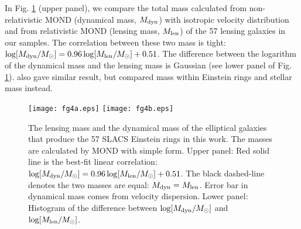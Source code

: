 \documentclass[fleqn,usenatbib,useAMS]{mnras}
\begin{document}
    In Fig. \ref{fig:Mass} (upper panel), we compare the total mass calculated from non-relativistic MOND (dynamical mass, $M_{\rm dyn}$) with isotropic velocity distribution and from relativistic MOND (lensing mass, $M_{\rm len}$) of the 57 lensing galaxies in our samples.
    The correlation between these two mass is tight: $\log[M_{\rm dyn}/M_{\odot}]=0.96\log[M_{\rm len}/M_{\odot}]+0.51$.
    The difference between the logarithm of the dynamical mass and the lensing mass is Gaussian (see lower panel of Fig. \ref{fig:Mass}).
    \cite{Sanders14} also gave similar result, but compared mass within Einstein rings and stellar mass instead.

    \begin{figure}
        \centering
        \texttt{[image: fg4a.eps]}
        \texttt{[image: fg4b.eps]}
        \caption{The lensing mass and the dynamical mass of the elliptical galaxies that produce the 57 SLACS Einstein rings in this work.
        The masses are calculated by MOND with simple form.
        Upper panel:
        Red solid line is the best-fit linear correlation: $\log[M_{\rm dyn}/M_{\odot}]=0.96\log[M_{\rm len}/M_{\odot}]+0.51$.
        The black dashed-line denotes the two masses are equal: $M_{\rm dyn}=M_{\rm len}$.
        Error bar in dynamical mass comes from velocity dispersion.
        Lower panel:
        Histogram of the difference between $\log[M_{\rm dyn}/M_{\odot}]$ and $\log[M_{\rm len}/M_{\odot}]$.}
        \label{fig:Mass}
    \end{figure}
\end{document}
